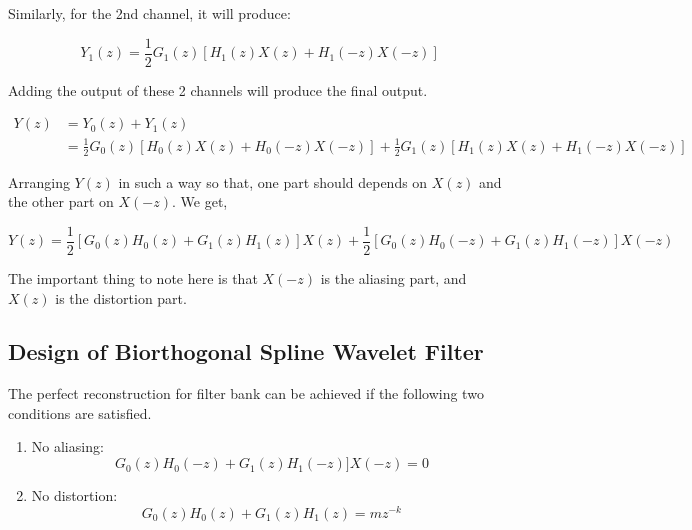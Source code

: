 Similarly, for the 2nd channel, it will produce:


\begin{equation} \label{eqn_wavelet_transform}
{Y_{1}(z) = \frac{1}{2}G_{1}(z)[H_{1}(z)X(z) + H_{1}(-z)X(-z)]}
\end{equation}

Adding the output of these 2 channels will produce the final output.



\begin{equation} \label{eq1}
\begin{split}
Y(z)  &= Y_{0}(z) + Y_{1}(z) \\
&= \frac{1}{2}G_{0}(z)[H_{0}(z)X(z) + H_{0}(-z)X(-z)] + \frac{1}{2}G_{1}(z)[H_{1}(z)X(z) + H_{1}(-z)X(-z)]
\end{split}
\end{equation}


Arranging $Y(z)$ in such a way so that, one part should depends on $X(z)$ and the other part on $X(-z)$. We get,

\begin{equation} \label{eqn_wavelet_transform}
{Y(z) = \frac{1}{2}[G_{0}(z)H_{0}(z) + G_{1}(z)H_{1}(z)]X(z) + \frac{1}{2}[G_{0}(z)H_{0}(-z) + G_{1}(z)H_{1}(-z)]X(-z)}
\end{equation}

The important thing to note here is that $X(-z)$ is the aliasing part, and $X(z)$ is the distortion part.


\subsection{Design of Biorthogonal Spline Wavelet Filter}

The perfect reconstruction for filter bank can be achieved if the following two conditions are satisfied.

\begin{enumerate}
	\item No aliasing: 
	\begin{equation} 
	{G_{0}(z)H_{0}(-z) + G_{1}(z)H_{1}(-z)]X(-z) = 0}
	\end{equation}
	\item No distortion:
	\begin{equation} 
	{G_{0}(z)H_{0}(z) + G_{1}(z)H_{1}(z) = mz^{-k}}
	\end{equation}
\end{enumerate}


